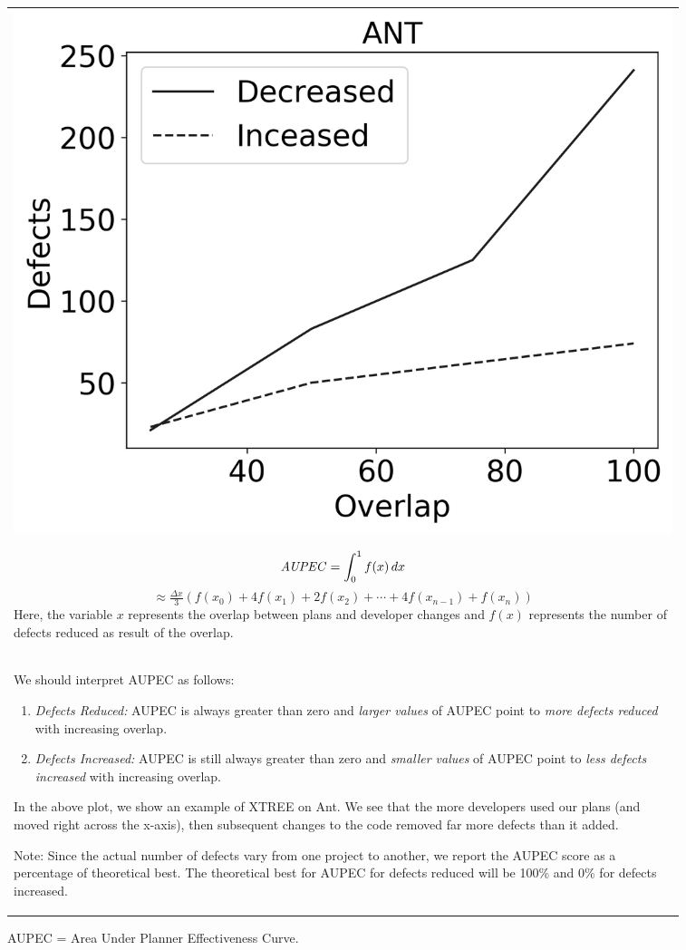 \begin{figure}[t!]
\small
\centering
\begin{tabular}{|p{0.95\linewidth}|} \hline
\begin{center}
    \includegraphics[width=0.7\linewidth]{sample_ant.png}
\end{center}
\[
\mathit{AUPEC} = \int_{0}^{1} f(x) \, dx \hfill
\]
\[\approx \tfrac{\Delta x}{3}\left(f(x_0) + 4f(x_1)+2f(x_2)+\cdots+4f(x_{n-1}) + f(x_{n})\right)
\]
Here, the variable $x$ represents the overlap between plans and developer changes
and  $f(x)$ represents the number of defects reduced as result of the overlap.\\

We should interpret AUPEC as follows:
\begin{enumerate}
    \item \textit{Defects Reduced:}
  AUPEC is always greater than zero and 
    \textit{larger values} of AUPEC point to \textit{more defects reduced} with increasing overlap.
    
        \item \textit{Defects Increased:}  AUPEC is still always greater than zero
        and \textit{smaller values} of AUPEC point to \textit{less defects increased} with increasing overlap.
   
\end{enumerate}
In the above plot, we show an example of XTREE on Ant. We see that the more developers used our plans (and moved right across the x-axis), then subsequent changes to the code removed far more defects than it added.  

Note: Since the actual number of defects vary from one project to another, we report the AUPEC score as a percentage of theoretical best. The theoretical best for AUPEC for defects reduced will be 100\% and 0\% for defects increased.
 
\\\hline
\end{tabular}
\caption{ AUPEC = Area Under Planner Effectiveness Curve.}
\label{fig:report_sample}
\end{figure}